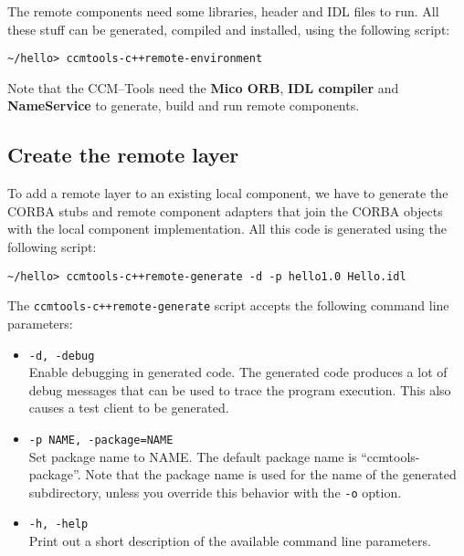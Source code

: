 The remote components need some libraries, header and IDL files to run. All these
stuff can be generated, compiled and installed, using the following script: 
\begin{small}
\begin{verbatim}
~/hello> ccmtools-c++remote-environment
\end{verbatim}
\end{small}
	
\noindent
Note that the CCM--Tools need the {\bf Mico ORB}, {\bf IDL compiler} and 
{\bf NameService} to generate, build and run remote components.

 

\subsection{Create the remote layer}

To add a remote layer to an existing local component, we have to generate the
CORBA stubs and remote component adapters that join the CORBA objects with the
local component implementation.
All this code is generated using the following script:

\begin{small}
\begin{verbatim}
~/hello> ccmtools-c++remote-generate -d -p hello1.0 Hello.idl
\end{verbatim}
\end{small}
The {\tt ccmtools-c++remote-generate} script accepts the following command line
parameters:
\begin{itemize}
\item {\tt -d, -\-debug }\\
Enable debugging in generated code. The generated code produces a lot of debug
messages that can be used to trace the program execution. This also causes a
test client to be generated.

\item {\tt -p NAME, -\-package=NAME}\\
Set package name to NAME. The default package name is ``ccmtools-package''. Note
that the package name is used for the name of the generated subdirectory, unless
you override this behavior with the {\tt -o} option.

\item {\tt -h, -\-help}\\
Print out a short description of the available command line parameters.
\end{itemize}


